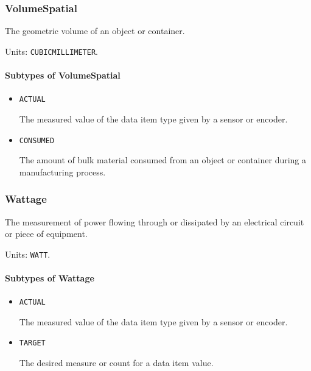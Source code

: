 \subsubsection{VolumeSpatial}
\label{sec:VolumeSpatial}



The geometric volume of an object or container.


Units: \texttt{CUBIC\textunderscore MILLIMETER}.

\paragraph{Subtypes of VolumeSpatial}\mbox{}
\label{sec:Subtypes of VolumeSpatial}

\begin{itemize}

\item \texttt{ACTUAL}


The measured value of the data item type given by a sensor or encoder.

\item \texttt{CONSUMED}


The amount of bulk material consumed from an object or container during a manufacturing process.


\end{itemize}

\subsubsection{Wattage}
\label{sec:Wattage}



The measurement of power flowing through or dissipated by an electrical circuit or piece of equipment.


Units: \texttt{WATT}.

\paragraph{Subtypes of Wattage}\mbox{}
\label{sec:Subtypes of Wattage}

\begin{itemize}

\item \texttt{ACTUAL}


The measured value of the data item type given by a sensor or encoder.

\item \texttt{TARGET}


The desired measure or count for a data item value.


\end{itemize}

